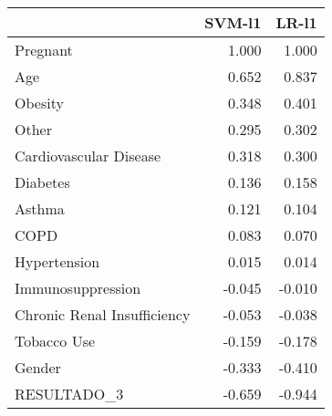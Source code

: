 \begin{tabular}{lrr}
\toprule
{} &  SVM-l1 &  LR-l1 \\
\midrule
Pregnant                    &   1.000 &  1.000 \\
Age                         &   0.652 &  0.837 \\
Obesity                     &   0.348 &  0.401 \\
Other                       &   0.295 &  0.302 \\
Cardiovascular Disease      &   0.318 &  0.300 \\
Diabetes                    &   0.136 &  0.158 \\
Asthma                      &   0.121 &  0.104 \\
COPD                        &   0.083 &  0.070 \\
Hypertension                &   0.015 &  0.014 \\
Immunosuppression           &  -0.045 & -0.010 \\
Chronic Renal Insufficiency &  -0.053 & -0.038 \\
Tobacco Use                 &  -0.159 & -0.178 \\
Gender                      &  -0.333 & -0.410 \\
RESULTADO\_3                 &  -0.659 & -0.944 \\
\bottomrule
\end{tabular}
